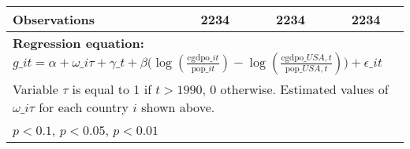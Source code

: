 \begin{table}[htbp]
\begin{tabular}{l*{3}{c}}
\midrule
Observations    &     2234         &     2234         &     2234         \\
\bottomrule
\multicolumn{4}{l}{\footnotesize \textbf{Regression equation:} \(g\_{it} = \alpha + \omega\_{i\tau} + \gamma\_t + \beta \big(\log (\frac{\textrm{cgdpo}\_{it}}{\textrm{pop}\_{it}} ) - \log (\frac{\textrm{cgdpo}\_{USA,t}}{\textrm{pop}\_{USA,t}}  ) \big) + \epsilon\_{it}\)}\\
\multicolumn{4}{l}{\footnotesize Variable \(\tau\) is equal to 1 if \(t > 1990\), 0 otherwise. Estimated values of \(\omega\_{i\tau}\) for each country \(i\) shown above.}\\
\multicolumn{4}{l}{\footnotesize \sym{*} \(p<0.1\), \sym{**} \(p<0.05\), \sym{***} \(p<0.01\)}\\
\end{tabular}
\end{table}
